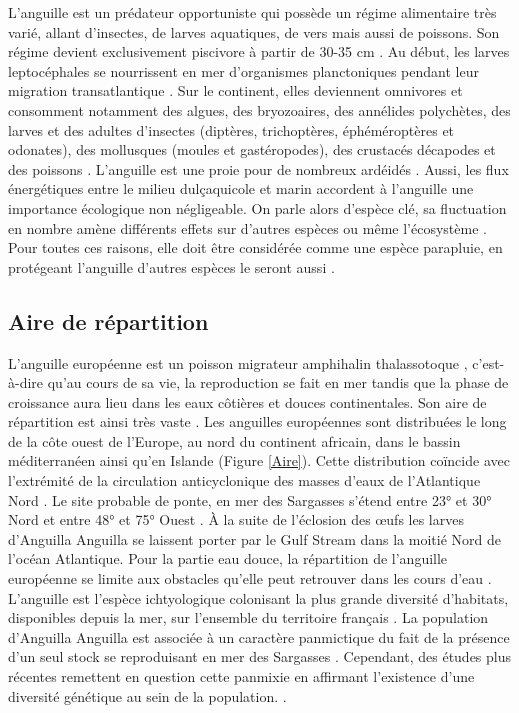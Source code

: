 \documentclass[11pt,titlepage,twoside]{article}\usepackage[]{graphicx}\usepackage[table]{xcolor}
\begin{document}
L’anguille est un prédateur opportuniste qui possède un régime alimentaire très varié, allant d’insectes, de larves aquatiques, de vers mais aussi de poissons. Son régime devient exclusivement piscivore à partir de 30-35 cm \citep{feunteun_commercially_2011}. Au début, les larves leptocéphales se nourrissent en mer d’organismes planctoniques pendant leur migration transatlantique \citep{riemann_qualitative_2010}. 
Sur le continent, elles deviennent omnivores et consomment notamment des algues, des bryozoaires, des annélides polychètes, des larves et des adultes d’insectes (diptères, trichoptères, éphéméroptères et odonates), des mollusques (moules et gastéropodes), des crustacés décapodes et des poissons \citep{pasquaud_determination_2010, jobling_eel_2004}. L’anguille est une proie pour de nombreux ardéidés \citep{feunteun_assessment_1994}.
Aussi, les flux énergétiques entre le milieu dulçaquicole et marin accordent à l’anguille une importance écologique non négligeable. On parle alors d’espèce clé, sa fluctuation en nombre amène différents effets sur d’autres espèces ou même l’écosystème \citep{willson_anadromous_1995}. Pour toutes ces raisons, elle doit être considérée comme une espèce parapluie, en protégeant l’anguille d’autres espèces le seront aussi \citep{baisez_outil_2005}.

\subsection{Aire de répartition}
	
L’anguille européenne est un poisson migrateur amphihalin thalassotoque \citep{adam_anguille_2008, brusle_anguille_1994, elie_migration_1994}, c’est- à-dire qu’au cours de sa vie, la reproduction se fait en mer tandis que la phase de croissance aura lieu dans les eaux côtières et douces continentales. Son aire de répartition est ainsi très vaste \citep{durif_migration_2003}. Les anguilles européennes sont distribuées le long de la côte ouest de l’Europe, au nord du continent africain, dans le bassin méditerranéen ainsi qu’en Islande (Figure \ref{Aire}). Cette distribution coïncide avec l’extrémité de la circulation anticyclonique des masses d’eaux de l’Atlantique Nord \citep{anthony_bases_2006}. Le site probable de ponte, en mer des Sargasses s’étend entre 23° et 30° Nord et entre 48° et 75° Ouest \citep{mccleave_reproductive_1987}. À la suite de l’éclosion des œufs les larves d’Anguilla Anguilla se laissent porter par le Gulf Stream dans la moitié Nord de l’océan Atlantique. Pour la partie eau douce, la répartition de l’anguille européenne se limite aux obstacles qu’elle peut retrouver dans les cours d’eau \citep{adam_anguille_1997}. L’anguille est l’espèce ichtyologique colonisant la plus grande diversité d’habitats, disponibles depuis la mer, sur l’ensemble du territoire français \citep{laffaille_spatial_2003, laffaille_habitat_2004}. La population d’Anguilla Anguilla est associée à un caractère panmictique du fait de la présence d’un seul stock se reproduisant en mer des Sargasses \citep{schmidt_ivbreeding_1922}. Cependant, des études plus récentes remettent en question cette panmixie en affirmant l’existence d’une diversité génétique au sein de la population. \citep{farrugio_etat_2011, pujolar_genetic_2007, daemen_analysis_2001}.
\end{document}
